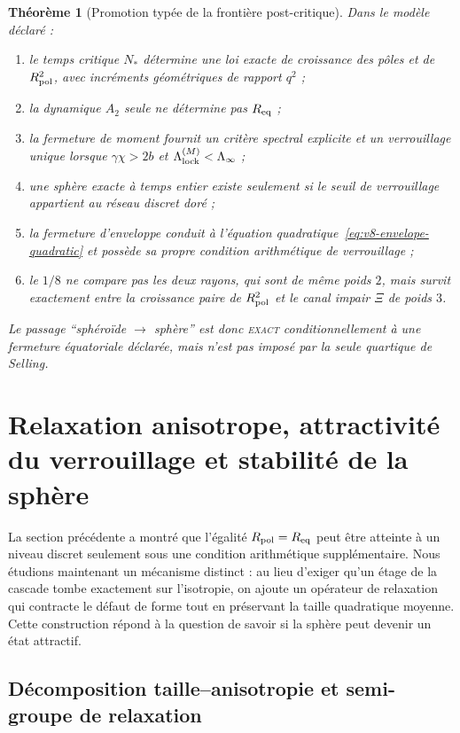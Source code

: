 \documentclass[11pt,a4paper]{article}
\newtheorem{theorem}{Théorème}[section]
\newcommand{\statusExact}{\textsc{exact}}
\begin{document}
\begin{theorem}[Promotion typée de la frontière post-critique]\label{thm:v8-promotion}
Dans le modèle déclaré :
\begin{enumerate}[label=\textup{(\roman*)}]
\item le temps critique $N_*$ détermine une loi exacte de croissance des pôles et de $R_{\rm pol}^2$, avec incréments géométriques de rapport $q^2$ ;
\item la dynamique $A_2$ seule ne détermine pas $R_{\rm eq}$ ;
\item la fermeture de moment fournit un critère spectral explicite et un verrouillage unique lorsque $\gamma\chi>2b$ et $\Lambda_{\rm lock}^{(M)}<\Lambda_\infty$ ;
\item une sphère exacte à temps entier existe seulement si le seuil de verrouillage appartient au réseau discret doré ;
\item la fermeture d'enveloppe conduit à l'équation quadratique~\eqref{eq:v8-envelope-quadratic} et possède sa propre condition arithmétique de verrouillage ;
\item le $1/8$ ne compare pas les deux rayons, qui sont de même poids $2$, mais survit exactement entre la croissance paire de $R_{\rm pol}^2$ et le canal impair $\Xi$ de poids $3$.
\end{enumerate}
Le passage ``sphéroïde $\to$ sphère'' est donc \statusExact{} conditionnellement à une fermeture équatoriale déclarée, mais n'est pas imposé par la seule quartique de Selling.
\end{theorem}



\section{Relaxation anisotrope, attractivité du verrouillage et stabilité de la sphère}\label{sec:dynamic-lock}

La section précédente a montré que l'égalité $R_{\rm pol}=R_{\rm eq}$ peut être atteinte à un niveau discret seulement sous une condition arithmétique supplémentaire. Nous étudions maintenant un mécanisme distinct : au lieu d'exiger qu'un étage de la cascade tombe exactement sur l'isotropie, on ajoute un opérateur de relaxation qui contracte le défaut de forme tout en préservant la taille quadratique moyenne. Cette construction répond à la question de savoir si la sphère peut devenir un état attractif.

\subsection{Décomposition taille--anisotropie et semi-groupe de relaxation}
\end{document}
